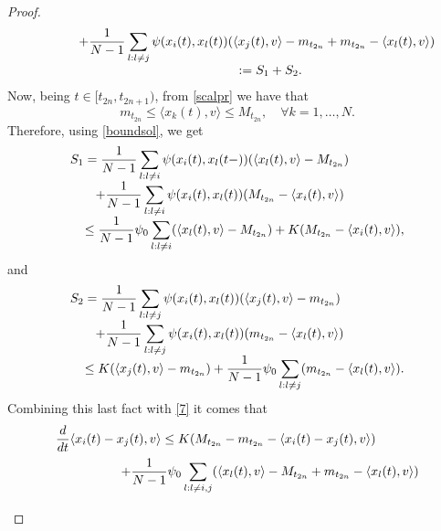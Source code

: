 \documentclass[a4paper,11pt,oneside]{article}
\begin{document}
\begin{proof}
$$\begin{array}{l}
			\displaystyle{\hspace{1.1cm}+\frac{1}{N-1}\sum_{l:l\neq j}\psi(x_{i}(t),x_{l}(t))(\langle x_{j}(t),v\rangle-m_{t_{2n}}+m_{t_{2n}}-\langle x_{l}(t),v\rangle)}\\
			\displaystyle{\hspace{5.5 cm}:=S_1+S_2.}
		\end{array}
		$$
		Now, being $t\in [t_{2n},t_{2n+1})$,  from \eqref{scalpr} we have that
		\begin{equation}\label{7}
			m_{t_{2n}}\leq\langle x_{k}(t),v\rangle\leq M_{t_{2n}}, \quad\forall k=1,\dots,N.
		\end{equation}
		Therefore, using \eqref{boundsol}, we get
		$$
		\begin{array}{l}
			\displaystyle{
				S_1=\frac{1}{N-1}\sum_{l:l\neq i}\psi(x_{i}(t),x_{l}(t-))(\langle x_{l}(t),v\rangle-M_{t_{2n}})}\\
			\displaystyle{\hspace{0.7 cm}+\frac{1}{N-1}\sum_{l:l\neq i}\psi(x_{i}(t),x_{l}(t))(M_{t_{2n}}-\langle x_{i}(t),v\rangle)}\\
			\displaystyle{\hspace{0.4 cm}\leq \frac{1}{N-1}\psi_{0}\sum_{l:l\neq i}(\langle x_{l}(t),v\rangle-M_{t_{2n}})+K(M_{t_{2n}}-\langle x_{i}(t),v\rangle)},
		\end{array}
		$$
		and	
		$$
		\begin{array}{l}
			\displaystyle{
				S_2=\frac{1}{N-1}\sum_{l:l\neq j}\psi(x_{i}(t),x_{l}(t))(\langle x_{j}(t),v\rangle-m_{t_{2n}})}\\
			\displaystyle{\hspace{0.7 cm}+\frac{1}{N-1}\sum_{l:l\neq j}\psi(x_{i}(t),x_{l}(t))(m_{t_{2n}}-\langle x_{l}(t),v\rangle)}\\
			\displaystyle{\hspace{0.4 cm}\leq K(\langle x_{j}(t),v\rangle-m_{t_{2n}})+\frac{1}{N-1}\psi_{0}\sum_{l:l\neq j}(m_{t_{2n}}-\langle x_{l}(t),v\rangle).}
		\end{array}
		$$
		Combining this last fact with \eqref{7} it comes that 
		$$\begin{array}{l}
			\vspace{0.2cm}\displaystyle{\frac{d}{dt}\langle x_{i}(t)-x_{j}(t),v\rangle\leq K(M_{t_{2n}}-m_{t_{2n}}-\langle x_{i}(t)-x_{j}(t),v\rangle)}\\
			\vspace{0.2cm}\displaystyle{\hspace{1.8 cm}+\frac{1}{N-1}\psi_{0}\sum_{l:l\neq i,j}(\langle x_{l}(t),v\rangle-M_{t_{2n}}+m_{t_{2n}}-\langle x_{l}(t),v\rangle)}\\

\end{array}$$
\end{proof}
\end{document}
